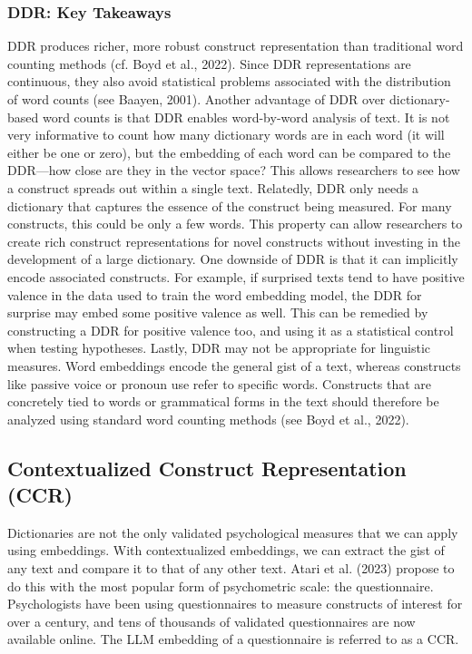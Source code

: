 \documentclass[
  man,
  floatsintext,
  longtable,
  nolmodern,
  notxfonts,
  notimes,
  colorlinks=true,linkcolor=blue,citecolor=blue,urlcolor=blue]{apa7}
\begin{document}
\subsubsection{DDR: Key Takeaways}\label{ddr-key-takeaways}

DDR produces richer, more robust construct representation than
traditional word counting methods (cf. Boyd et al., 2022). Since DDR
representations are continuous, they also avoid statistical problems
associated with the distribution of word counts (see Baayen, 2001).
Another advantage of DDR over dictionary-based word counts is that DDR
enables word-by-word analysis of text. It is not very informative to
count how many dictionary words are in each word (it will either be one
or zero), but the embedding of each word can be compared to the
DDR---how close are they in the vector space? This allows researchers to
see how a construct spreads out within a single text. Relatedly, DDR
only needs a dictionary that captures the essence of the construct being
measured. For many constructs, this could be only a few words. This
property can allow researchers to create rich construct representations
for novel constructs without investing in the development of a large
dictionary. One downside of DDR is that it can implicitly encode
associated constructs. For example, if surprised texts tend to have
positive valence in the data used to train the word embedding model, the
DDR for surprise may embed some positive valence as well. This can be
remedied by constructing a DDR for positive valence too, and using it as
a statistical control when testing hypotheses. Lastly, DDR may not be
appropriate for linguistic measures. Word embeddings encode the general
gist of a text, whereas constructs like passive voice or pronoun use
refer to specific words. Constructs that are concretely tied to words or
grammatical forms in the text should therefore be analyzed using
standard word counting methods (see Boyd et al., 2022).

\subsection{Contextualized Construct Representation
(CCR)}\label{contextualized-construct-representation-ccr}

Dictionaries are not the only validated psychological measures that we
can apply using embeddings. With contextualized embeddings, we can
extract the gist of any text and compare it to that of any other text.
Atari et al. (2023) propose to do this with the most popular form of
psychometric scale: the questionnaire. Psychologists have been using
questionnaires to measure constructs of interest for over a century, and
tens of thousands of validated questionnaires are now available online.
The LLM embedding of a questionnaire is referred to as a CCR.
\end{document}
